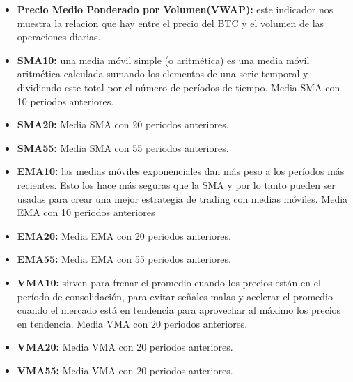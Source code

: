 \documentclass[11pt]{article} %
\begin{document}
\begin{itemize}
	
	\item \textbf{Precio Medio Ponderado por Volumen(VWAP):} este indicador nos muestra la relacion que hay entre el precio del BTC y el volumen de las operaciones diarias.
	
	\item \textbf{SMA10:} una media móvil simple (o aritmética) es una media móvil aritmética calculada sumando los elementos de una serie temporal y dividiendo este total por el número de períodos de tiempo. Media SMA con 10 periodos anteriores.

	\item \textbf{SMA20:} Media SMA con 20 periodos anteriores.

	\item \textbf{SMA55:} Media SMA con 55 periodos anteriores.

	\item \textbf{EMA10:} las medias móviles exponenciales dan más peso a los períodos más recientes. Esto los hace más seguras que la SMA y por lo tanto pueden ser usadas para crear una mejor estrategia de trading con medias móviles. Media EMA con 10 periodos anteriores

	\item \textbf{EMA20:} Media EMA con 20 periodos anteriores.

	\item \textbf{EMA55:} Media EMA con 55 periodos anteriores.

	\item \textbf{VMA10:} sirven para frenar el promedio cuando los precios están en el período de consolidación, para evitar señales malas y acelerar el promedio cuando el mercado está en tendencia para aprovechar al máximo los precios en tendencia.  Media VMA con 20 periodos anteriores.

	\item \textbf{VMA20:} Media VMA con 20 periodos anteriores.

	\item \textbf{VMA55:} Media VMA con 20 periodos anteriores.
	
\end{itemize}
\end{document}
